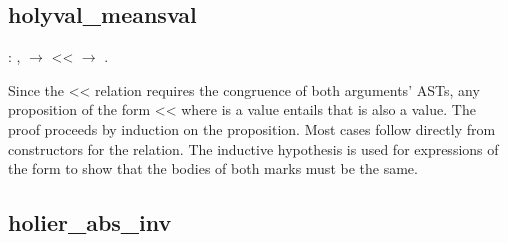 \documentclass[12pt]{report}
\begin{document}
\begin{prooftree}
\end{prooftree}

\begin{prooftree}
\end{prooftree}

\begin{prooftree}
\end{prooftree}
\begin{coqdoccode}
\coqdocemptyline
\coqdocemptyline
\coqdocemptyline
\end{coqdoccode}
\subsection{holyval\_meansval}

\begin{coqdoccode}
\coqdocemptyline
\coqdocindent{1.00em}
  : \coqdockw{\ensuremath{\forall}}  ,\coqdoceol
\coqdocindent{2.00em}
  \ensuremath{\rightarrow}\coqdoceol
\coqdocindent{2.00em}
 <<  \ensuremath{\rightarrow}\coqdoceol
\coqdocindent{2.00em}
 .\coqdoceol
\coqdocemptyline
\end{coqdoccode}
Since the << relation requires the congruence of both
arguments' ASTs, any proposition of the form  <<  where  is
a value entails that  is also a value. The proof proceeds by
induction on the  proposition. Most cases follow directly from
constructors for the  relation. The inductive hypothesis is
used for expressions of the form    to show that the
bodies of both marks must be the same. 

\subsection{holier\_abs\_inv}
\end{document}
